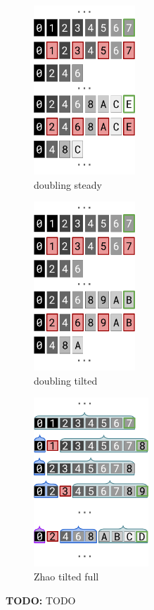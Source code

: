 \begin{figure}
\begin{subfigure}{0.23\linewidth}
\centering
\includegraphics[height=2.5in]{img/surface-control-naive-steady}
\caption{doubling steady}
\label{fig:surface-control:naive-steady}
\end{subfigure}%
\begin{subfigure}{0.23\linewidth}
\centering
\includegraphics[height=2.5in]{img/surface-control-naive-tilted}
\caption{doubling tilted}
\label{fig:surface-control:naive-tilted}
\end{subfigure}%
\begin{subfigure}{0.25\linewidth}
\centering
\includegraphics[height=2.5in]{img/surface-control-zhao-tilted-ext}
\caption{Zhao tilted full}
\label{fig:surface-control:zhao-tilted-ext}
\end{subfigure}%
\begin{minipage}{0.29\linewidth}
\vspace*{-4.9in}
\caption{%
\textbf{TODO:}
\footnotesize
TODO
}
\label{fig:surface-control}
\end{minipage}
\end{figure}
